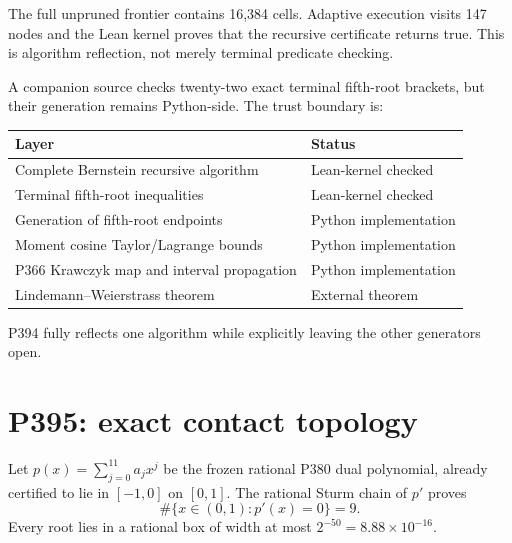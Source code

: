 \documentclass[11pt,a4paper,openany]{report}
\begin{document}
The full unpruned frontier contains 16,384 cells. Adaptive execution visits
147 nodes and the Lean kernel proves that the recursive certificate returns
true. This is algorithm reflection, not merely terminal predicate checking.

A companion source checks twenty-two exact terminal fifth-root brackets, but
their generation remains Python-side. The trust boundary is:
\begin{center}
\small
\begin{longtable}{@{}p{}p{}@{}}
\toprule
\textbf{Layer} & \textbf{Status}\\
\midrule
\endhead
Complete Bernstein recursive algorithm & Lean-kernel checked\\
Terminal fifth-root inequalities & Lean-kernel checked\\
Generation of fifth-root endpoints & Python implementation\\
Moment cosine Taylor/Lagrange bounds & Python implementation\\
P366 Krawczyk map and interval propagation & Python implementation\\
Lindemann--Weierstrass theorem & External theorem\\
\bottomrule
\end{longtable}
\end{center}
P394 fully reflects one algorithm while explicitly leaving the other
generators open.

\chapter{P395: exact contact topology}

Let $p(x)=\sum_{j=0}^{11}a_jx^j$ be the frozen rational P380 dual polynomial,
already certified to lie in $[-1,0]$ on $[0,1]$. The rational Sturm chain of
$p'$ proves
\[
\#\{x\in(0,1):p'(x)=0\}=9.
\]
Every root lies in a rational box of width at most
$2^{-50}=8.88\times10^{-16}$.
\end{document}
